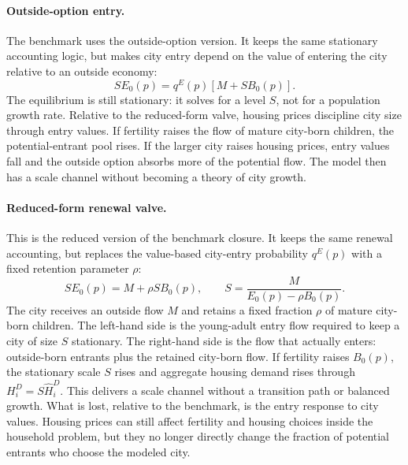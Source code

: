 \documentclass[11pt]{article}
\begin{document}
\paragraph{Outside-option entry.}
The benchmark uses the outside-option version. It keeps the same stationary accounting logic, but makes city entry depend on the value of entering the city relative to an outside economy:
\begin{equation*}
    S E_0(p)
    =
    q^E(p)\left[M+S B_0(p)\right].
\end{equation*}
The equilibrium is still stationary: it solves for a level $S$, not for a population growth rate. Relative to the reduced-form valve, housing prices discipline city size through entry values. If fertility raises the flow of mature city-born children, the potential-entrant pool rises. If the larger city raises housing prices, entry values fall and the outside option absorbs more of the potential flow. The model then has a scale channel without becoming a theory of city growth.

\paragraph{Reduced-form renewal valve.}
This is the reduced version of the benchmark closure. It keeps the same renewal accounting, but replaces the value-based city-entry probability $q^E(p)$ with a fixed retention parameter $\rho$:
\begin{equation*}
    S E_0(p)=M+\rho S B_0(p),
    \qquad
    S=\frac{M}{E_0(p)-\rho B_0(p)}.
\end{equation*}
The city receives an outside flow $M$ and retains a fixed fraction $\rho$ of mature city-born children. The left-hand side is the young-adult entry flow required to keep a city of size $S$ stationary. The right-hand side is the flow that actually enters: outside-born entrants plus the retained city-born flow. If fertility raises $B_0(p)$, the stationary scale $S$ rises and aggregate housing demand rises through $H_i^D=S\widehat H_i^D$. This delivers a scale channel without a transition path or balanced growth. What is lost, relative to the benchmark, is the entry response to city values. Housing prices can still affect fertility and housing choices inside the household problem, but they no longer directly change the fraction of potential entrants who choose the modeled city.
\end{document}
